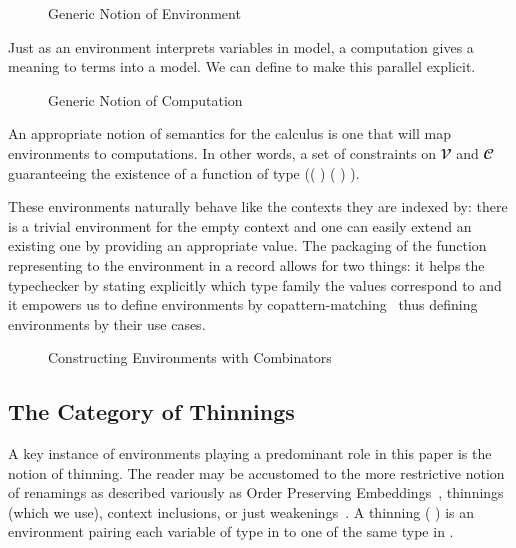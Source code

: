 \begin{figure}[h]
\caption{Generic Notion of Environment\label{fig:env}}
\end{figure}

Just as an environment interprets variables in model, a computation gives a meaning
to terms into a model. We can define  to make this parallel explicit.

\begin{figure}[h]
\caption{Generic Notion of Computation\label{fig:comp}}
\end{figure}

An appropriate notion of semantics for the calculus is one that
will map environments to computations. In other words, a set of
constraints on $𝓥$ and $𝓒$ guaranteeing the existence of a function
of type (( )    ( )  ).

These environments naturally behave like the contexts they are indexed by:
there is a trivial environment for the empty context and one can easily
extend an existing one by providing an appropriate value. The packaging of
the function representing to the environment in a record allows for two
things: it helps the typechecker by stating explicitly which type family
the values correspond to and it empowers us to define environments by
copattern-matching~\cite{abel2013copatterns} thus defining environments
by their use cases.

\begin{figure}[h]
\caption{Constructing Environments with Combinators\label{fig:envcombinators}}
\end{figure}

\subsection{The Category of Thinnings}
\label{sec:categoryrenamings}

A key instance of environments playing a predominant role in this paper is the
notion of thinning. The reader may be accustomed to the more restrictive notion
of renamings as described variously as Order Preserving
Embeddings~\cite{chapman2009type}, thinnings (which we use), context inclusions,
or just weakenings~\cite{altenkirch1995categorical}.
A thinning (  ) is an environment pairing each variable
of type  in  to one of the same type in .

